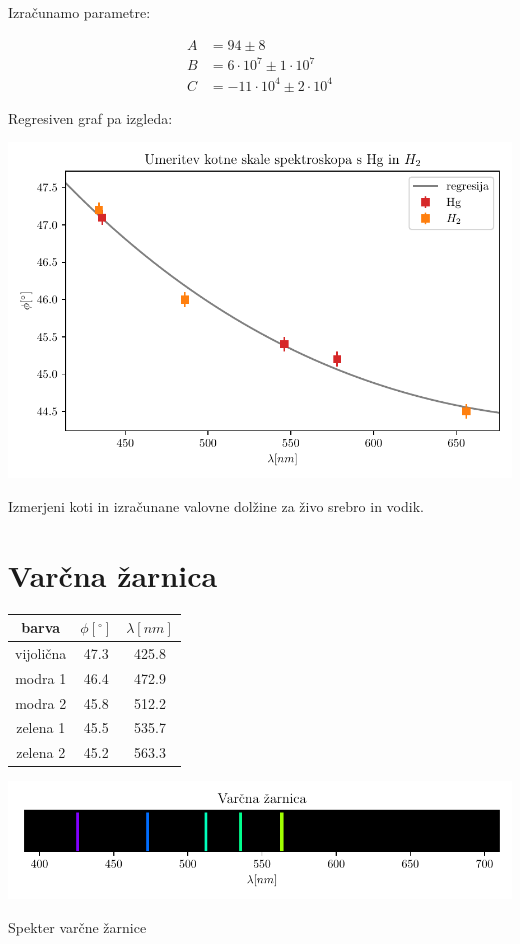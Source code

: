 \documentclass[12pt]{report}
\begin{document}
Izračunamo parametre: 

\begin{align*}
  A &= 94 \pm 8 \\
  B &= 6 \cdot 10^{7} \pm 1 \cdot 10^{7} \\
  C &= -11 \cdot 10^{4} \pm 2 \cdot 10^{4}
\end{align*}

Regresiven graf pa izgleda: 

\begin{slika}[H]
  \centering
  \includegraphics{kalibracija}
  \caption{\small Izmerjeni koti in izračunane valovne dolžine za živo srebro in vodik.}
\end{slika}

\section*{Varčna žarnica}

\begin{tabela}[H]
  \centering
  \begin{tabular}{|c|c|c|}\hline
    barva & $\phi [^{\circ}]$ & $\lambda [nm]$ \\ \hline
    vijolična & 47.3 &   425.8\\
    modra 1 & 46.4 &   472.9\\
    modra 2 & 45.8 &   512.2\\
    zelena 1 & 45.5 &   535.7\\
    zelena 2 &  45.2 &   563.3 \\ \hline
  \end{tabular}
\end{tabela}

\begin{slika}[H]
  \centering
  \includegraphics{Vzarnica}
  \caption{\small Spekter varčne žarnice}
\end{slika}
\end{document}
